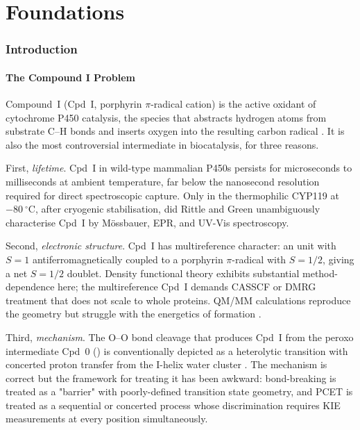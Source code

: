 \documentclass[11pt,twocolumn,a4paper]{article}
\theoremstyle{definition}
\theoremstyle{remark}
\begin{document}
\part{Foundations}

\section{Introduction}
\label{sec:introduction}

\subsection{The Compound I Problem}

Compound~I (Cpd~I,  porphyrin $\pi$-radical cation) is the
active oxidant of cytochrome P450 catalysis, the species that abstracts
hydrogen atoms from substrate C--H bonds and inserts oxygen into the
resulting carbon radical \citep{groves1976, ortizdemontellano2015}. It is
also the most controversial intermediate in biocatalysis, for three reasons.

First, \emph{lifetime}. Cpd~I in wild-type mammalian P450s persists for
microseconds to milliseconds at ambient temperature, far below the
nanosecond resolution required for direct spectroscopic capture. Only in
the thermophilic CYP119 at $-80~^\circ$C, after cryogenic stabilisation,
did Rittle and Green \citep{rittle2010} unambiguously characterise Cpd~I by
M\"{o}ssbauer, EPR, and UV-Vis spectroscopy.

Second, \emph{electronic structure}. Cpd~I has multireference character: an
 unit with $S = 1$ antiferromagnetically coupled to a porphyrin
$\pi$-radical with $S = 1/2$, giving a net $S = 1/2$ doublet. Density
functional theory exhibits substantial method-dependence here; the
multireference Cpd~I demands CASSCF or DMRG treatment that does not scale
to whole proteins. QM/MM calculations reproduce the geometry but struggle
with the energetics of formation \citep{shaik2010}.

Third, \emph{mechanism}. The O--O bond cleavage that produces Cpd~I from the
peroxo intermediate Cpd~0 () is conventionally depicted as
a heterolytic transition with concerted proton transfer from the I-helix
water cluster \citep{denisov2005}. The mechanism is correct but the
framework for treating it has been awkward: bond-breaking is treated as a
"barrier" with poorly-defined transition state geometry, and PCET is
treated as a sequential or concerted process whose discrimination requires
KIE measurements at every position simultaneously.
\end{document}

